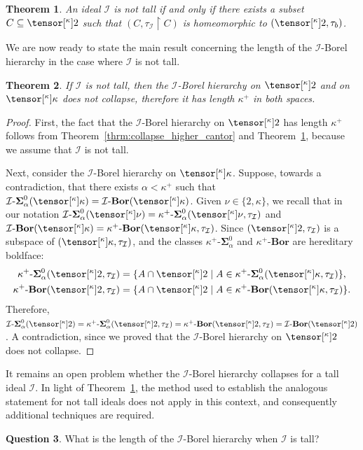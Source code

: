 \documentclass{amsart}
\numberwithin{equation}{section}
\newcommand{\I}{\mathcal{I}}
\newcommand{\pre}[2]{\tensor[^{#1}]{#2}{}}
\newcommand{\1}{\mathbf{I}}
\newcommand{\2}{\mathbf{II}}
\newcommand{\Bor}{\k^+\text{-}\mathbf{Bor}}
\newcommand{\Sii}[2]{\k^+\text{-}\boldsymbol{\Sigma}^{ #1 }_{ #2}}
\newcommand{\Borid}{\I\text{-}\mathbf{Bor}}
\newcommand{\Siid}[2]{\I\text{-}\boldsymbol{\Sigma}^{ #1 }_{ #2}}
\renewcommand{\a}{\alpha}
\renewcommand{\k}{\kappa}
\newtheorem{theorem}{Theorem}[section]
\theoremstyle{definition}
\newtheorem{question}[theorem]{Question}
\theoremstyle{remark}
\begin{document}
\begin{theorem}\label{tall_and_homeo}
An ideal \(\I\) is not tall if and only if there exists a subset \(C \subseteq \pre{\k}{2}\) such that \((C, \tau_\I\restriction C)\) is homeomorphic to \((\pre{\k}{2}, \tau_b)\).
\end{theorem}



We are now ready to state the main result concerning the length of the \(\I\)-Borel hierarchy in the case where \(\I\) is not tall. 
\begin{theorem}\label{non-collapse} 
 If $\I$ is not tall, then the \(\I\)-Borel hierarchy on \(\pre{\k}{2}\) and on \(\pre{\k}{\k}\) does not collapse, therefore it has length \(\k^+\) in both spaces. 
\end{theorem}
\begin{proof}
First, the fact that the \(\I\)-Borel hierarchy on \(\pre{\k}{2}\) has length \(\k^+\) follows from Theorem~\ref{thrm:collapse_higher_cantor} and Theorem~\ref{tall_and_homeo}, because we assume that \(\I\) is not tall. 


Next, consider the \(\I\)-Borel hierarchy on \(\pre{\k}{\k}\). 
Suppose, towards a contradiction, that there exists  \(\a<\k^+\) such that  \(\Siid{0}{\a}(\pre{\k}{\k}) =\Borid(\pre{\k}{\k})\). Given \(\nu \in \{2, \k\}\), we recall that in our notation \(\Siid{0}{\a}(\pre{\k}{\nu})=\Sii{0}{\a}(\pre{\k}{\nu} , \tau_\I)\) and \(\Borid(\pre{\k}{\k})=\Bor(\pre{\k}{\k} , \tau_\I) \). 
Since \((\pre{\k}{2}, \tau_\I)\) is a subspace of \((\pre{\k}{\k}, \tau_\I)\), and the classes \(\Sii{0}{\a}\) and \(\Bor\) are hereditary boldface:
 \begin{align*}
 \Sii{0}{\a}(\pre{\k}{2} , \tau_\I) &= \{A \cap \pre{\k}{2} \mid A \in \Sii{0}{\a}(\pre{\k}{\k} , \tau_\I)\},\\
 \Bor(\pre{\k}{2} , \tau_\I)&=\{A \cap \pre{\k}{2} \mid A \in \Bor(\pre{\k}{\k} , \tau_\I)\}.
  \end{align*} 
  Therefore, \(\Siid{0}{\a}(\pre{\k}{2})=\Sii{0}{\a}(\pre{\k}{2} , \tau_\I) =\Bor(\pre{\k}{2} , \tau_\I)=\Borid(\pre{\k}{2})\). A contradiction, since we proved that the \(\I\)-Borel hierarchy on \(\pre{\k}{2}\) does not collapse.
\end{proof}

It remains an open problem whether the \(\I\)-Borel hierarchy collapses for a tall ideal \(\I\). In light of Theorem~\ref{tall_and_homeo}, the method used to establish the analogous statement for not tall ideals does not apply in this context, and consequently additional techniques are required.
\begin{question}
  What is the length of the \(\I\)-Borel hierarchy when \(\I\) is tall?
\end{question}
\end{document}
